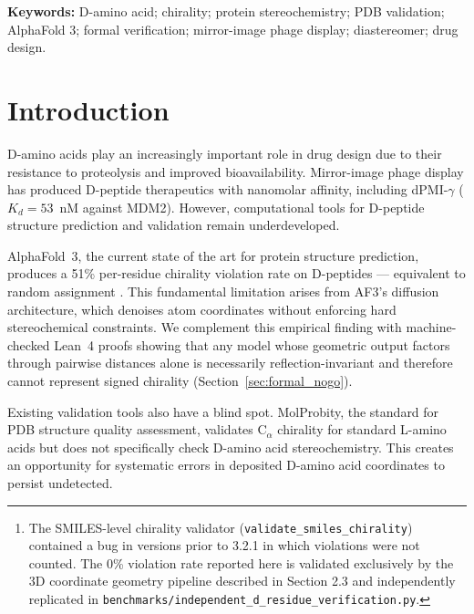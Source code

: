 \documentclass[11pt]{article}
\begin{document}
\begin{abstract}
uses the complete \citet{childs2025} AF3 experimental universe of ${\sim}32{,}550$ chiral residues; Fisher's exact $p \approx 6.66 \times 10^{-144}$ reflects the contrast between that universe and ChiralFold's 0/467 result on the same sequences, and should be read as evidence that ChiralFold closes a gap that diffusion-based predictors cannot address by construction --- not as a head-to-head accuracy comparison.\footnote{The SMILES-level chirality validator (\texttt{validate\_smiles\_chirality}) contained a bug in versions prior to 3.2.1 in which violations were not counted. The 0\% violation rate reported here is validated exclusively by the 3D coordinate geometry pipeline described in Section 2.3 and independently replicated in \texttt{benchmarks/independent\_d\_residue\_verification.py}.} ChiralFold is available as a pip-installable Python package at \url{https://github.com/Tommaso-R-Marena/ChiralFold}.
\end{abstract}

\noindent\textbf{Keywords:} D-amino acid; chirality; protein stereochemistry; PDB validation; AlphaFold 3; formal verification; mirror-image phage display; diastereomer; drug design.

\section{Introduction}

D-amino acids play an increasingly important role in drug design due to their resistance to proteolysis and improved bioavailability. Mirror-image phage display has produced D-peptide therapeutics with nanomolar affinity, including dPMI-$\gamma$ ($K_d=53$~nM against MDM2). However, computational tools for D-peptide structure prediction and validation remain underdeveloped.

AlphaFold~3, the current state of the art for protein structure prediction, produces a 51\% per-residue chirality violation rate on D-peptides --- equivalent to random assignment \citep{childs2025}. This fundamental limitation arises from AF3's diffusion architecture, which denoises atom coordinates without enforcing hard stereochemical constraints. We complement this empirical finding with machine-checked Lean~4 proofs showing that any model whose geometric output factors through pairwise distances alone is necessarily reflection-invariant and therefore cannot represent signed chirality (Section~\ref{sec:formal_nogo}).

Existing validation tools also have a blind spot. MolProbity, the standard for PDB structure quality assessment, validates C$_\alpha$ chirality for standard L-amino acids but does not specifically check D-amino acid stereochemistry. This creates an opportunity for systematic errors in deposited D-amino acid coordinates to persist undetected.
\end{document}
